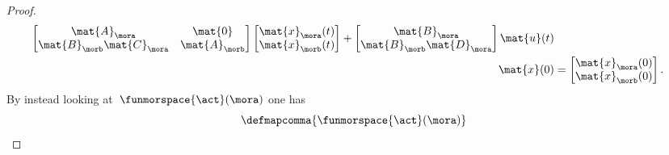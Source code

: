 \begin{proof}
\begin{equation}
\begin{aligned}
\begin{bmatrix}
                                                  \mat{A}_\mora              & \mat{0}       \\
                                                  \mat{B}_\morb\mat{C}_\mora & \mat{A}_\morb
                                              \end{bmatrix} \begin{bmatrix}
                                                                \mat{x}_\mora(t) \\
                                                                \mat{x}_\morb(t)
                                                            \end{bmatrix}+\begin{bmatrix}
                                                                              \mat{B}_\mora \\
                                                                              \mat{B}_\morb\mat{D}_\mora
                                                                          \end{bmatrix}\mat{u}(t) \\
            \mat{x}(0)                                & =
            \begin{bmatrix}
                \mat{x}_\mora(0) \\
                \mat{x}_\morb(0)\end{bmatrix}.
        \end{aligned}
    \end{equation}
    By instead looking at~$\funmorspace{\act}(\mora)$ one has
    \begin{equation*}
        \defmapcomma{\funmorspace{\act}(\mora)}

\end{equation*}
\end{proof}
